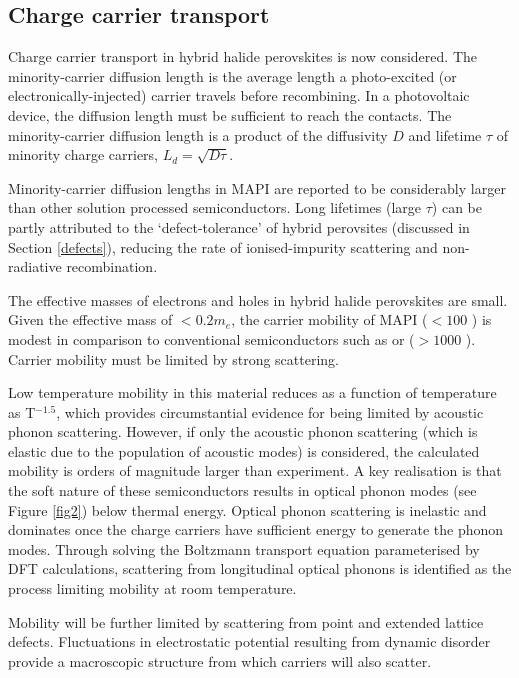 \subsection{Charge carrier transport}

Charge carrier transport in hybrid halide perovskites is now considered.
The minority-carrier diffusion length is the average length a photo-excited (or electronically-injected) carrier travels before recombining. 
In a photovoltaic device, the diffusion length must be sufficient to reach the contacts.
The minority-carrier diffusion length is a product of the diffusivity $D$ and lifetime $\tau$ of minority charge carriers, $L_d = \sqrt{D\tau}$.

Minority-carrier diffusion lengths in MAPI are reported to be considerably larger than other solution processed semiconductors.\autocite{Li2015zz}
%
Long lifetimes (large $\tau$) can be partly attributed to the `defect-tolerance' of hybrid perovsites (discussed in Section \ref{defects}), reducing the rate of ionised-impurity scattering and non-radiative recombination.  

The effective masses of electrons and holes in hybrid halide perovskites are small.
Given the effective mass of $< 0.2 m_e$,  the carrier mobility of MAPI ($< 100$ \mob) is modest in comparison to conventional semiconductors such as  or  ($> 1000$ \mob).\autocite{Stranks2015b}
Carrier mobility must be limited by strong scattering.

Low temperature mobility in this material reduces as a function of temperature as T$^{-1.5}$, which provides circumstantial evidence for being limited by acoustic phonon scattering.\autocite{Karakus2015,Yi2016a}
However, if only the acoustic phonon scattering (which is elastic due to the population of acoustic modes) is considered, the calculated mobility is orders of magnitude larger than experiment. 
A key realisation is that the soft nature of these semiconductors results in optical phonon modes (see Figure \ref{fig2}) below thermal energy.\autocite{Brivio2015a,PerezOsorio2015a}
Optical phonon scattering is inelastic and dominates once the charge carriers have sufficient energy to generate the phonon modes.\autocite{Leguy2016} 
Through solving the Boltzmann transport equation parameterised by DFT calculations, scattering from longitudinal optical phonons is identified as the process limiting mobility at room temperature.\autocite{Wright2016,Filippetti2016}

Mobility will be further limited by scattering from point and extended lattice defects.\autocite{Ball2016}
Fluctuations in electrostatic potential resulting from dynamic disorder provide a macroscopic structure from which carriers will also scatter.\autocite{Frost2014,Ma2014d}


